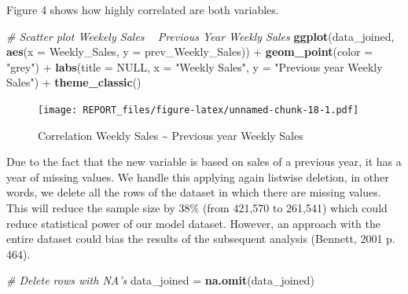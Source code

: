 \documentclass[11pt,]{article}
\newenvironment{Shaded}{\begin{snugshade}}{\end{snugshade}}
\newcommand{\KeywordTok}[1]{\textcolor[rgb]{0.13,0.29,0.53}{\textbf{{#1}}}}
\newcommand{\DataTypeTok}[1]{\textcolor[rgb]{0.13,0.29,0.53}{{#1}}}
\newcommand{\DecValTok}[1]{\textcolor[rgb]{0.00,0.00,0.81}{{#1}}}
\newcommand{\StringTok}[1]{\textcolor[rgb]{0.31,0.60,0.02}{{#1}}}
\newcommand{\CommentTok}[1]{\textcolor[rgb]{0.56,0.35,0.01}{\textit{{#1}}}}
\newcommand{\OtherTok}[1]{\textcolor[rgb]{0.56,0.35,0.01}{{#1}}}
\newcommand{\NormalTok}[1]{{#1}}
\begin{document}
\begin{Shaded}
\end{Shaded}

Figure 4 shows how highly correlated are both variables.

\begin{Shaded}
\begin{Highlighting}[]
\CommentTok{# Scatter plot Weekely Sales ~ Previous Year Weekly Sales}
\KeywordTok{ggplot}\NormalTok{(data_joined, }\KeywordTok{aes}\NormalTok{(}\DataTypeTok{x =} \NormalTok{Weekly_Sales, }\DataTypeTok{y =} \NormalTok{prev_Weekly_Sales)) +}\StringTok{ }
\StringTok{    }\KeywordTok{geom_point}\NormalTok{(}\DataTypeTok{color =} \StringTok{"grey"}\NormalTok{) +}\StringTok{ }\KeywordTok{labs}\NormalTok{(}\DataTypeTok{title =} \OtherTok{NULL}\NormalTok{, }\DataTypeTok{x =} \StringTok{"Weekly Sales"}\NormalTok{, }
    \DataTypeTok{y =} \StringTok{"Previous year Weekly Sales"}\NormalTok{) +}\StringTok{ }\KeywordTok{theme_classic}\NormalTok{()}
\end{Highlighting}
\end{Shaded}

\begin{figure}[htbp]
\centering
\texttt{[image: REPORT\_files/figure-latex/unnamed-chunk-18-1.pdf]}
\caption{Correlation Weekly Sales \textasciitilde{} Previous year Weekly
Sales}
\end{figure}

Due to the fact that the new variable is based on sales of a previous
year, it has a year of missing values. We handle this applying again
listwise deletion, in other words, we delete all the rows of the dataset
in which there are missing values. This will reduce the sample size by
38\% (from 421,570 to 261,541) which could reduce statistical power of
our model dataset. However, an approach with the entire dataset could
bias the results of the subsequent analysis (Bennett, 2001 p. 464).

\begin{Shaded}
\begin{Highlighting}[]
\CommentTok{# Delete rows with NA's}
\NormalTok{data_joined =}\StringTok{ }\KeywordTok{na.omit}\NormalTok{(data_joined)}
\end{Highlighting}
\end{Shaded}
\end{document}
